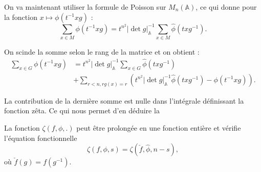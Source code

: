 On va maintenant utiliser la formule de Poisson sur $M_n(\mathbb{A})$, ce qui donne pour la fonction $x \mapsto \phi(t^{-1}xg)$ :
\begin{equation}
\sum_{x \in M} \phi(t^{-1}xg) = t^{n^2}|\det g|_\mathbb{A}^{-1}\sum_{x \in M} \hat{\phi}(txg^{-1}).
\end{equation}

On scinde la somme selon le rang de la matrice et on obtient :
\begin{equation}
\begin{split}
\sum_{x \in G} \phi(t^{-1}xg) &= t^{n^2}|\det g|_\mathbb{A}^{-1}\sum_{x \in G} \hat{\phi}(txg^{-1}) \\
&+ \sum_{r < n, rg(x)=r} \left( t^{n^2}|\det g|_\mathbb{A}^{-1}\hat{\phi}(txg^{-1}) - \phi(t^{-1}xg)\right).
\end{split}
\end{equation}

La contribution de la dernière somme est nulle dans l'intégrale définissant la fonction zêta. Ce qui nous permet d'en déduire la
\begin{proposition}
La fonction $\zeta(f, \phi, .)$ peut être prolongée en une fonction entière et vérifie l'équation fonctionnelle
\begin{equation}
\zeta(f, \phi, s) = \zeta(\check{f}, \hat{\phi}, n-s),
\end{equation}
où $\check{f}(g)=f(g^{-1})$.
\end{proposition}

